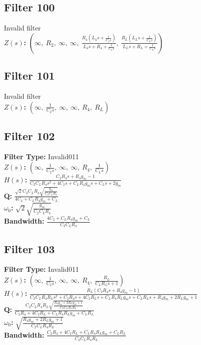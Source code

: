 \documentclass{article}
\begin{document}
\subsection*{Filter 100}
Invalid filter \\ 
\textbf{$Z(s)$:} $\left( \infty, \  R_{2}, \  \infty, \  \infty, \  \frac{R_{4} \left(L_{4} s + \frac{1}{C_{4} s}\right)}{L_{4} s + R_{4} + \frac{1}{C_{4} s}}, \  \frac{R_{L} \left(L_{L} s + \frac{1}{C_{L} s}\right)}{L_{L} s + R_{L} + \frac{1}{C_{L} s}}\right)$ \\ 
\subsection*{Filter 101}
Invalid filter \\ 
\textbf{$Z(s)$:} $\left( \infty, \  \frac{1}{C_{2} s}, \  \infty, \  \infty, \  R_{4}, \  R_{L}\right)$ \\ 
\subsection*{Filter 102}
\textbf{Filter Type:} Invalid011 \\ 
\textbf{$Z(s)$:} $\left( \infty, \  \frac{1}{C_{2} s}, \  \infty, \  \infty, \  R_{4}, \  \frac{1}{C_{L} s}\right)$ \\ 
\textbf{$H(s)$:} $\frac{C_{2} R_{4} s + R_{4} g_{m} - 1}{C_{2} C_{L} R_{4} s^{2} + 4 C_{2} s + C_{L} R_{4} g_{m} s + C_{L} s + 2 g_{m}}$ \\ 
\textbf{Q:} $\frac{\sqrt{2} C_{2} C_{L} R_{4} \sqrt{\frac{g_{m}}{C_{2} C_{L} R_{4}}}}{4 C_{2} + C_{L} R_{4} g_{m} + C_{L}}$ \\ 
\textbf{$\omega_0$:} $\sqrt{2} \sqrt{\frac{g_{m}}{C_{2} C_{L} R_{4}}}$ \\ 
\textbf{Bandwidth:} $\frac{4 C_{2} + C_{L} R_{4} g_{m} + C_{L}}{C_{2} C_{L} R_{4}}$ \\ 
\subsection*{Filter 103}
\textbf{Filter Type:} Invalid011 \\ 
\textbf{$Z(s)$:} $\left( \infty, \  \frac{1}{C_{2} s}, \  \infty, \  \infty, \  R_{4}, \  \frac{R_{L}}{C_{L} R_{L} s + 1}\right)$ \\ 
\textbf{$H(s)$:} $\frac{R_{L} \left(C_{2} R_{4} s + R_{4} g_{m} - 1\right)}{C_{2} C_{L} R_{4} R_{L} s^{2} + C_{2} R_{4} s + 4 C_{2} R_{L} s + C_{L} R_{4} R_{L} g_{m} s + C_{L} R_{L} s + R_{4} g_{m} + 2 R_{L} g_{m} + 1}$ \\ 
\textbf{Q:} $\frac{C_{2} C_{L} R_{4} R_{L} \sqrt{\frac{R_{4} g_{m} + 2 R_{L} g_{m} + 1}{C_{2} C_{L} R_{4} R_{L}}}}{C_{2} R_{4} + 4 C_{2} R_{L} + C_{L} R_{4} R_{L} g_{m} + C_{L} R_{L}}$ \\ 
\textbf{$\omega_0$:} $\sqrt{\frac{R_{4} g_{m} + 2 R_{L} g_{m} + 1}{C_{2} C_{L} R_{4} R_{L}}}$ \\ 
\textbf{Bandwidth:} $\frac{C_{2} R_{4} + 4 C_{2} R_{L} + C_{L} R_{4} R_{L} g_{m} + C_{L} R_{L}}{C_{2} C_{L} R_{4} R_{L}}$ \\ 
\end{document}
